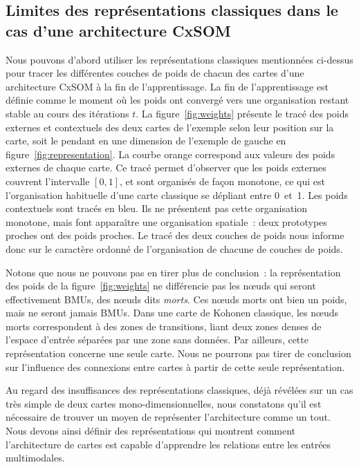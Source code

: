 \documentclass[../main]{subfiles}
\begin{document}
\subsection{Limites des représentations classiques dans le cas d'une architecture CxSOM}


Nous pouvons d'abord utiliser les représentations classiques mentionnées ci-dessus pour tracer les différentes couches de poids de chacun des cartes d'une architecture CxSOM à la fin de l'apprentissage.
La fin de l'apprentissage est définie comme le moment où les poids ont convergé vers une organisation restant stable au cours des itérations $t$.
La figure~\ref{fig:weights} présente le tracé des poids externes et contextuels des deux cartes de l'exemple selon leur position sur la carte, soit le pendant en une dimension de l'exemple de gauche en figure~\ref{fig:representation}.
La courbe orange correspond aux valeurs des poids externes de chaque carte.
Ce tracé permet d'observer que les poids externes couvrent l'intervalle $[0,1]$, et sont organisés de façon monotone, ce qui est l'organisation habituelle d'une carte classique se dépliant entre 0~et~1.
Les poids contextuels sont tracés en bleu. Ils ne présentent pas cette organisation monotone, mais font apparaître une organisation spatiale~: deux prototypes proches ont des poids proches. 
Le tracé des deux couches de poids nous informe donc sur le caractère ordonné de l'organisation de chacune de couches de poids. 

Notons que nous ne pouvons pas en tirer plus de conclusion~: la représentation des poids de la figure~\ref{fig:weights} ne différencie pas les n\oe{}uds qui seront effectivement BMUs, des n\oe{}uds dits \emph{morts}.
Ces n\oe{}uds morts ont bien un poids, mais ne seront jamais BMUs.
Dans une carte de Kohonen classique, les n\oe{}uds morts correspondent à des zones de transitions, liant deux zones denses de l'espace d'entrée séparées par une zone sans données.
Par ailleurs, cette représentation concerne une seule carte. Nous ne pourrons pas tirer de conclusion sur l'influence des connexions entre cartes à partir de cette seule représentation.

Au regard des insuffisances des représentations classiques, déjà révélées sur un cas très simple de deux cartes mono-dimensionnelles, nous constatons qu'il est nécessaire de trouver un moyen de représenter l'architecture comme un tout. Nous devons ainsi définir des représentations qui montrent comment l'architecture de cartes est capable d'apprendre les relations entre les entrées multimodales.
\end{document}
